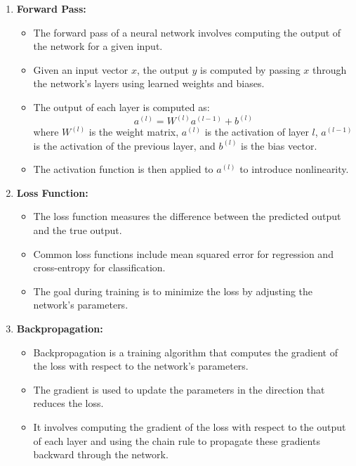 \documentclass[12pt]{article}
\begin{document}
\begin{enumerate}
    \item \textbf{Forward Pass:}
        \begin{itemize}
            \item The forward pass of a neural network involves computing the output of the network for a given input.
            \item Given an input vector \(x\), the output \(y\) is computed by passing \(x\) through the network's layers using learned weights and biases.
            \item The output of each layer is computed as:
            \[
            a^{(l)} = W^{(l)}a^{(l-1)} + b^{(l)}
            \]
            where \(W^{(l)}\) is the weight matrix, \(a^{(l)}\) is the activation of layer \(l\), \(a^{(l-1)}\) is the activation of the previous layer, and \(b^{(l)}\) is the bias vector.
            \item The activation function is then applied to \(a^{(l)}\) to introduce nonlinearity.
        \end{itemize}
    
    \item \textbf{Loss Function:}
        \begin{itemize}
            \item The loss function measures the difference between the predicted output and the true output.
            \item Common loss functions include mean squared error for regression and cross-entropy for classification.
            \item The goal during training is to minimize the loss by adjusting the network's parameters.
        \end{itemize}
    
    \item \textbf{Backpropagation:}
        \begin{itemize}
            \item Backpropagation is a training algorithm that computes the gradient of the loss with respect to the network's parameters.
            \item The gradient is used to update the parameters in the direction that reduces the loss.
            \item It involves computing the gradient of the loss with respect to the output of each layer and using the chain rule to propagate these gradients backward through the network.
        \end{itemize}
\end{enumerate}
\end{document}
